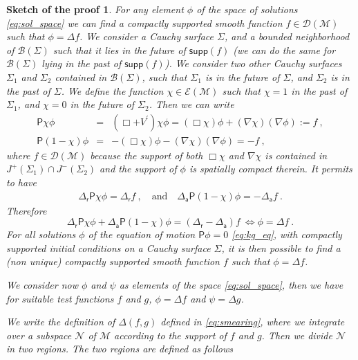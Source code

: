 \documentclass[11pt]{book}
\newcommand{\supp}{\mathsf{supp}}
\newcommand{\Bcal}{\mathcal{B}}
\newcommand{\Dcal}{\mathcal{D}}
\newcommand{\Ecal}{\mathcal{E}}
\newcommand{\Mcal}{\mathcal{M}}
\newcommand{\Ncal}{\mathcal{N}}
\newcommand{\Psf}{\mathsf{P}}
\newcommand{\asf}{\mathsf{a}}
\newcommand{\rsf}{\mathsf{r}}
\theoremstyle{break}
\newtheorem*{sketch}{Sketch of the proof}[chapter]
\begin{document}
\begin{sketch}
For any element $\phi$ of the space of solutions \eqref{eq:sol_space} we can find a compactly supported smooth function $f \in \Dcal(\Mcal)$ such that $\phi = \Delta f$. We consider a Cauchy surface $\Sigma$, and a bounded neighborhood of $\Bcal(\Sigma)$ such that it lies in the future of $\supp(f)$ (we can do the same for $\Bcal(\Sigma)$ lying in the past of $\supp(f)$). We consider two other Cauchy surfaces $\Sigma_1$ and $\Sigma_2$ contained in $\Bcal(\Sigma)$, such that $\Sigma_1$ is in the future of $\Sigma$, and $\Sigma_2$ is in the past of $\Sigma$. We define the function $\chi \in \Ecal(\Mcal)$ such that $\chi =1$ in the past of $\Sigma_1$, and $\chi = 0$ in the future of $\Sigma_2$. Then we can write
%
\begin{eqnarray*}
\Psf \chi \phi &=& (\Box + V^\prime) \chi \phi = (\Box \chi) \phi + (\nabla \chi) (\nabla \phi) := f \ , \\
\Psf (1- \chi)\phi &=& - (\Box \chi) \phi - (\nabla \chi) (\nabla \phi) = - f \ , 
\end{eqnarray*}
%
where $f \in \Dcal(\Mcal)$ because the support of both $\Box \chi$ and $\nabla \chi$ is contained in $J^+(\Sigma_1)\cap J^-(\Sigma_2)$ and the support of $\phi$ is spatially compact therein. It permits to have
%
\begin{eqnarray*}
\Delta_\rsf \Psf \chi \phi = \Delta_\rsf f \ , \quad \mbox{and} \quad  \Delta_\asf \Psf (1-\chi) \phi = - \Delta_\asf f \ .
\end{eqnarray*}
%
Therefore
%
\begin{equation*}
\Delta_\rsf \Psf \chi \phi + \Delta_\asf \Psf (1-\chi) \phi = (\Delta_\rsf - \Delta_\asf) f \ \Leftrightarrow \phi = \Delta f \ .
\end{equation*}
%
For all solutions $\phi$ of the equation of motion $\Psf \phi =0$ \eqref{eq:kg_eq}, with compactly supported initial conditions on a Cauchy surface $\Sigma$, it is then possible to find a (non unique) compactly supported smooth function $f$ such that $\phi = \Delta f$.\par%
%
We consider now $\phi$ and $\psi$ as elements of the space \eqref{eq:sol_space}, then we have for suitable test functions $f$ and $g$, $\phi=\Delta f$ and $\psi=\Delta g$.\par%
%
We write the definition of $\Delta(f,g)$ defined in \eqref{eq:smearing}, where we integrate over a subspace $\Ncal$ of $\Mcal$ according to the support of $f$ and $g$. Then we divide $\Ncal$ in two regions. The two regions are defined as follows

\end{sketch}
\end{document}
